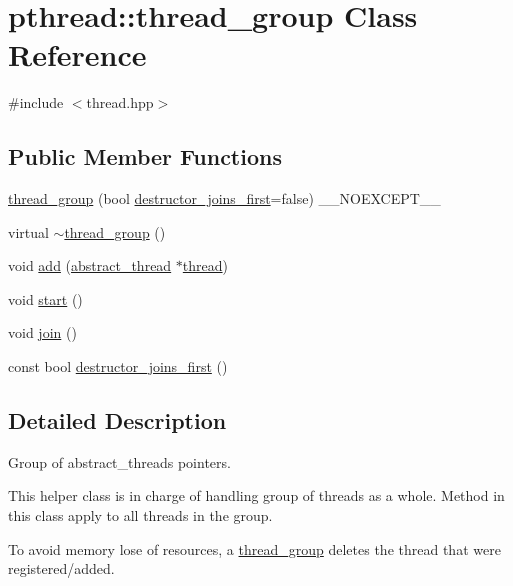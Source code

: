 \hypertarget{classpthread_1_1thread__group}{}\section{pthread\+:\+:thread\+\_\+group Class Reference}
\label{classpthread_1_1thread__group}


{\ttfamily \#include $<$thread.\+hpp$>$}

\subsection*{Public Member Functions}
\begin{DoxyCompactItemize}
\item 
\hyperlink{classpthread_1_1thread__group_ab4a8be5396449131ce2817db0e6ea2c2}{thread\+\_\+group} (bool \hyperlink{classpthread_1_1thread__group_a67df7bb484fb8657228a909a126489d3}{destructor\+\_\+joins\+\_\+first}=false) \+\_\+\+\_\+\+N\+O\+E\+X\+C\+E\+P\+T\+\_\+\+\_\+
\item 
virtual \hyperlink{classpthread_1_1thread__group_a2aeeb86d1523e2a7c175df3162331e4f}{$\sim$thread\+\_\+group} ()
\item 
void \hyperlink{classpthread_1_1thread__group_ae9fa9ce6e7b4c2222d04a446b3c23ca0}{add} (\hyperlink{classpthread_1_1abstract__thread}{abstract\+\_\+thread} $\ast$\hyperlink{classpthread_1_1thread}{thread})
\item 
void \hyperlink{classpthread_1_1thread__group_aaba00cf80d72cd986526384482457968}{start} ()
\item 
void \hyperlink{classpthread_1_1thread__group_a39937a77e1059e352c9b39407a866f6e}{join} ()
\item 
const bool \hyperlink{classpthread_1_1thread__group_a67df7bb484fb8657228a909a126489d3}{destructor\+\_\+joins\+\_\+first} ()
\end{DoxyCompactItemize}


\subsection{Detailed Description}
Group of abstract\+\_\+threads pointers.

This helper class is in charge of handling group of threads as a whole. Method in this class apply to all threads in the group.

To avoid memory lose of resources, a \hyperlink{classpthread_1_1thread__group}{thread\+\_\+group} deletes the thread that were registered/added. 

